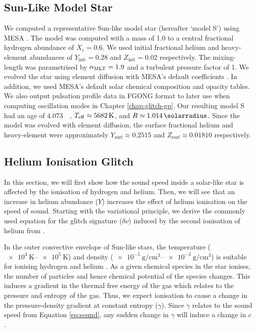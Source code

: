 \subsection{Sun-Like Model Star}\label{sec:model-s}

We computed a representative Sun-like model star (hereafter `model S') using MESA \citep[version 12115;][]{Paxton.Bildsten.ea2011,Paxton.Cantiello.ea2013,Paxton.Marchant.ea2015,Paxton.Schwab.ea2018,Paxton.Smolec.ea2019,Jermyn.Bauer.ea2023}. The model was computed with a mass of \SI{1.0}{\solarmass} to a central fractional hydrogen abundance of \(X_c=0.6\). We used initial fractional helium and heavy-element abundances of \(Y_\mathrm{init} = 0.28\) and \(Z_\mathrm{init}=0.02\) respectively. The mixing-length was parametrised by \({\alpha_\mathrm{MLT}}=1.9\) and a turbulent pressure factor of 1. We evolved the star using element diffusion with MESA's default coefficients \citep{Stanton.Murillo2016}. In addition, we used MESA's default \citet{Grevesse.Sauval1998} solar chemical composition and opacity tables. We also output pulsation profile data in FGONG format to later use when computing oscillation modes in Chapter \ref{chap:glitch-gp}. Our resulting model S had an age of \SI{4.073}{\giga\year}, \({T_\mathrm{eff}} \approx \SI{5682}{\kelvin}\), and \(R \approx \SI{1.014}{\solarradius}\). Since the model was evolved with element diffusion, the surface fractional helium and heavy-element were approximately \(Y_\mathrm{surf} \approx 0.2515\) and \(Z_\mathrm{surf} \approx 0.01810\) respectively.

\subsection{Helium Ionisation Glitch}\label{sec:helium-glitch}

In this section, we will first show how the sound speed inside a solar-like star is affected by the ionisation of hydrogen and helium. Then, we will see that an increase in helium abundance (\(Y\)) increases the effect of helium ionisation on the speed of sound. Starting with the variational principle, we derive the commonly used equation for the glitch signature (\(\delta\nu\)) induced by the second ionisation of helium from \citet{Houdek.Gough2007}.

In the outer convective envelope of Sun-like stars, the temperature (\(\SIrange{e4}{e5}{\kelvin}\)) and density (\(\SIrange{e-5}{e-3}{\gram\per\centi\metre\cubed}\)) is suitable for ionising hydrogen and helium \citep{Eggleton.Faulkner.ea1973}. As a given chemical species in the star ionises, the number of particles and hence chemical potential of the species changes. This induces a gradient in the thermal free energy of the gas which relates to the pressure and entropy of the gas. Thus, we expect ionisation to cause a change in the pressure-density gradient at constant entropy (\(\gamma\)). Since \(\gamma\) relates to the sound speed from Equation \ref{eq:sound}, any sudden change in \(\gamma\) will induce a change in \(c\).

